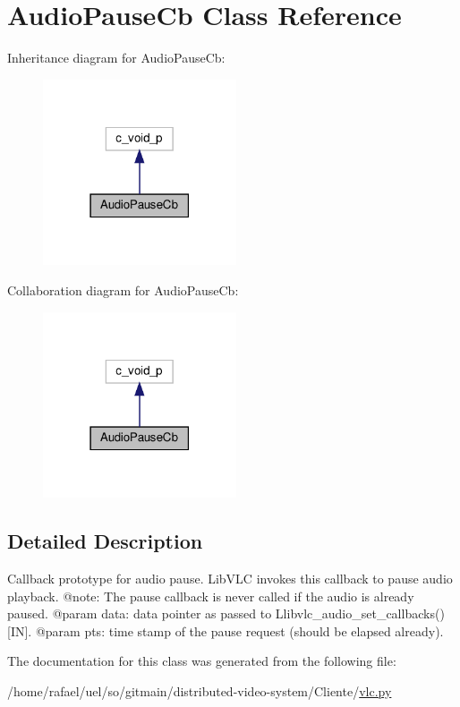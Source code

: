 \hypertarget{classvlc_1_1_audio_pause_cb}{}\section{Audio\+Pause\+Cb Class Reference}
\label{classvlc_1_1_audio_pause_cb}


Inheritance diagram for Audio\+Pause\+Cb\+:
\nopagebreak
\begin{figure}[H]
\begin{center}
\leavevmode
\includegraphics[width=162pt]{classvlc_1_1_audio_pause_cb__inherit__graph}
\end{center}
\end{figure}


Collaboration diagram for Audio\+Pause\+Cb\+:
\nopagebreak
\begin{figure}[H]
\begin{center}
\leavevmode
\includegraphics[width=162pt]{classvlc_1_1_audio_pause_cb__coll__graph}
\end{center}
\end{figure}


\subsection{Detailed Description}
\begin{DoxyVerb}Callback prototype for audio pause.
LibVLC invokes this callback to pause audio playback.
@note: The pause callback is never called if the audio is already paused.
@param data: data pointer as passed to L{libvlc_audio_set_callbacks}() [IN].
@param pts: time stamp of the pause request (should be elapsed already).
\end{DoxyVerb}
 

The documentation for this class was generated from the following file\+:\begin{DoxyCompactItemize}
\item 
/home/rafael/uel/so/gitmain/distributed-\/video-\/system/\+Cliente/\hyperlink{vlc_8py}{vlc.\+py}\end{DoxyCompactItemize}
